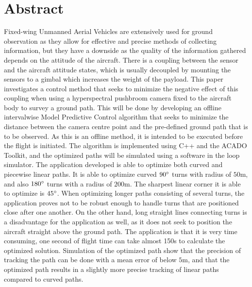 \chapter*{Abstract}

Fixed-wing Unmanned Aerial Vehicles are extensively used for ground observation as they allow for effective and precise methods of collecting information, but they have a downside as the quality of the information gathered depends on the attitude of the aircraft. There is a coupling between the sensor and the aircraft attitude states, which is usually decoupled by mounting the sensors to a gimbal which increases the weight of the payload. This paper investigates a control method that seeks to minimize the negative effect of this coupling when using a hyperspectral pushbroom camera fixed to the aircraft body to survey a ground path. This will be done by developing an offline intervalwise Model Predictive Control algorithm that seeks to minimize the distance between the camera centre point and the pre-defined ground path that is to be observed. As this is an offline method, it is intended to be executed before the flight is initiated. The algorithm is implemented using C++ and the ACADO Toolkit, and the optimized paths will be simulated using a software in the loop simulator. The application developed is able to optimize both curved and piecewise linear paths. It is able to optimize curved $90\degree$ turns with radius of $50$m, and also $180\degree$ turns with a radius of $200$m. The sharpest linear corner it is able to optimize is $45\degree$. When optimizing longer paths consisting of several turns, the application proves not to be robust enough to handle turns that are positioned close after one another. On the other hand, long straight lines connecting turns is a disadvantage for the application as well, as it does not seek to position the aircraft straight above the ground path. The application is that it is very time consuming, one second of flight time can take almost 150s to calculate the optimized solution. Simulation of the optimized path show that the precision of tracking the path can be done with a mean error of below $5$m, and that the optimized path results in a slightly more precise tracking of linear paths compared to curved paths.